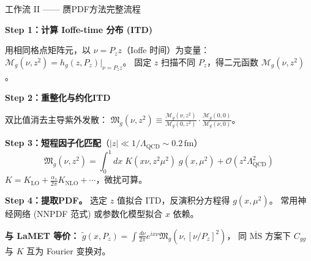 \documentclass[10pt,aspectratio=169]{beamer}
\newcommand{\msbar}{\overline{\mathrm{MS}}}
\newcommand{\lqcd}{\Lambda_{\mathrm{QCD}}}
\newcommand{\fm}{\,\mathrm{fm}}
\begin{document}
\begin{frame}{工作流 II —— 赝PDF方法完整流程}

  \textbf{Step 1：计算 Ioffe-time 分布 (ITD)}

  用相同格点矩阵元，以 $\nu = P_z z$（Ioffe 时间）为变量：$\mathcal{M}_g(\nu, z^2) = h_g(z, P_z)|_{\nu = P_z z}$。
  固定 $z$ 扫描不同 $P_z$，得二元函数 $\mathcal{M}_g(\nu, z^2)$。

  \textbf{Step 2：重整化与约化ITD}

  双比值消去主导紫外发散：
  $\displaystyle\mathfrak{M}_g(\nu, z^2) \equiv
  \frac{\mathcal{M}_g(\nu, z^2)}{\mathcal{M}_g(0, z^2)}
  \cdot \frac{\mathcal{M}_g(0, 0)}{\mathcal{M}_g(\nu, 0)}$。

  \textbf{Step 3：短程因子化匹配}（$|z| \ll 1/\lqcd \sim 0.2\fm$）
  \begin{equation*}
    \mathfrak{M}_g(\nu, z^2) = \int_0^1 dx\;
    K(x\nu, z^2\mu^2)\; g(x, \mu^2) + \mathcal{O}(z^2\lqcd^2)
  \end{equation*}
  $K = K_{\mathrm{LO}} + \frac{\alpha_s}{2\pi}K_{\mathrm{NLO}} + \cdots$，微扰可算。

  \textbf{Step 4：提取PDF。} 选定 $z$ 值拟合 ITD，反演积分方程得 $g(x,\mu^2)$。
  常用神经网络 (NNPDF 范式) 或参数化模型拟合 $x$ 依赖。

  \textbf{与 LaMET 等价：}
  $\tilde{g}(x, P_z) = \int \frac{d\nu}{2\pi} e^{ix\nu} \mathfrak{M}_g(\nu, [\nu/P_z]^2)$，
  同 $\msbar$ 方案下 $C_{gg}$ 与 $K$ 互为 Fourier 变换对。\vspace{-4pt}
\end{frame}
\end{document}
